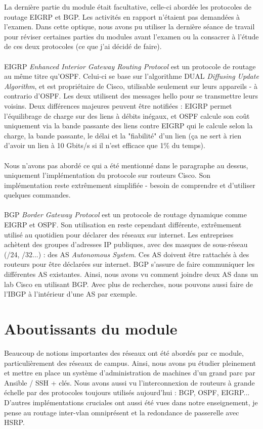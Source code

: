 La dernière partie du module était facultative, celle-ci abordée les protocoles de routage EIGRP et BGP. Les activités en rapport n'étaient pas demandées à l'examen. Dans cette optique, nous avons pu utiliser la dernière séance de travail pour réviser certaines parties du modules avant l'examen ou la consacrer à l'étude de ces deux protocoles (ce que j'ai décidé de faire).
\\ \\
EIGRP \textit{Enhanced Interior Gateway Routing Protocol} est un protocole de routage au même titre qu'OSPF. Celui-ci se base sur l'algorithme DUAL \textit{Diffusing Update Algorithm}, et est propriétaire de Cisco, utilisable seulement sur leurs appareils - à contrario d'OSPF. Les deux utilisent des messages hello pour se transmettre leurs voisins. Deux différences majeures peuvent être notifiées : EIGRP permet l'équilibrage de charge sur des liens à débits inégaux, et OSPF calcule son coût uniquement via la bande passante des liens contre EIGRP qui le calcule selon la charge, la bande passante, le délai et la "fiabilité" d'un lien (ça ne sert à rien d'avoir un lien à 10 Gbits/s si il n'est efficace que 1\% du temps).
\\ \\
Nous n'avons pas abordé ce qui a été mentionné dans le paragraphe au dessus, uniquement l'implémentation du protocole sur routeurs Cisco. Son implémentation reste extrêmement simplifiée - besoin de comprendre et d'utiliser quelques commandes.
\\ \\
BGP \textit{Border Gateway Protocol} est un protocole de routage dynamique comme EIGRP et OSPF. Son utilisation en reste cependant différente, extrêmement utilisé au quotidien pour déclarer des réseaux sur internet. Les entreprises achètent des groupes d'adresses IP publiques, avec des masques de sous-réseau (/24, /32...) : des AS \textit{Autonomous System}. Ces AS doivent être rattachés à des routeurs pour être déclarées sur internet. BGP s'assure de faire communiquer les différentes AS existantes. Ainsi, nous avons vu comment joindre deux AS dans un lab Cisco en utilisant BGP. Avec plus de recherches, nous pouvons aussi faire de l'IBGP à l'intérieur d'une AS par exemple.

\section{Aboutissants du module}

Beaucoup de notions importantes des réseaux ont été abordés par ce module, particulièrement des réseaux de campus. Ainsi, nous avons pu étudier pleinement et mettre en place un système d'administration de machines d'un grand parc par Ansible / SSH + clés. Nous avons aussi vu l'interconnexion de routeurs à grande échelle par des protocoles toujours utilisés aujourd'hui : BGP, OSPF, EIGRP... D'autres implémentations cruciales ont aussi été vues dans notre enseignement, je pense au routage inter-vlan omniprésent et la redondance de passerelle avec HSRP.